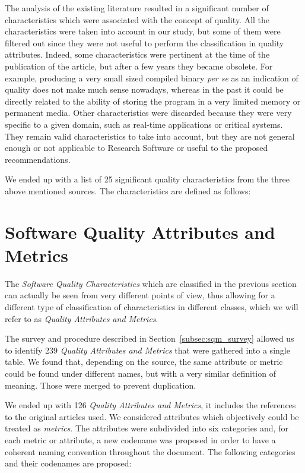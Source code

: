 \documentclass[a4paper]{article}
\begin{document}
The analysis of the existing literature resulted in a significant number of characteristics which were associated with the concept of quality. All the characteristics were taken into account in our study, but some of them were filtered out since they were not useful to perform the classification in quality attributes. Indeed, some characteristics were pertinent at the time of the publication of the article, but after a few years they became obsolete. For example, producing a very small sized compiled binary \textit{per se} as an indication of quality does not make much sense nowadays, whereas in the past it could be directly related to the ability of storing the program in a very limited memory or permanent media. Other characteristics were discarded because they were very specific to a given domain, such as real-time applications or critical systems. They remain valid characteristics to take into account, but they are not general enough or not applicable to Research Software or useful to the proposed recommendations.

We ended up with a list of 25 significant quality characteristics from the three above mentioned sources. The characteristics are defined as follows:



\newpage
\section{Software Quality Attributes and Metrics}
\label{subsec:SW_quality_attributes}

The \textit{Software Quality Characteristics} which are classified in the previous section can actually be seen from very different points of view, thus allowing for a different type of classification of characteristics in different classes, which we will refer to as \textit{Quality Attributes and Metrics}.

The survey and procedure described in Section~\ref{subsec:sqm_survey} allowed us to identify 239 \textit{Quality Attributes and Metrics} that were gathered into a single table. We found that, depending on the source, the same attribute or metric could be found under different names, but with a very similar definition of meaning. Those were merged to prevent duplication.

We ended up with 126 \textit{Quality Attributes and Metrics}, it includes the references to the original articles used. We considered attributes which objectively could be treated as \textit{metrics}. The attributes were subdivided into six categories and, for each metric or attribute, a new codename was proposed in order to have a coherent naming convention throughout the document. The following categories and their codenames are proposed:
\end{document}
